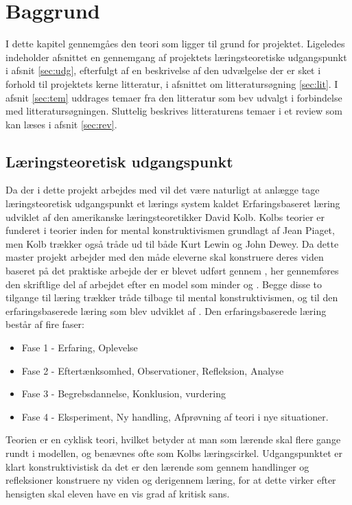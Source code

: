 \chapter{Baggrund}
\label{Ch:2}

I dette kapitel gennemgåes den teori som ligger til grund for projektet. Ligeledes indeholder afsnittet en gennemgang af projektets læringsteoretiske udgangspunkt i afsnit \vref{sec:udg}, efterfulgt af en beskrivelse af den udvælgelse der er sket i forhold til projektets kerne litteratur, i afsnittet om litteratursøgning \vref{sec:lit}. I afsnit \vref{sec:tem} uddrages temaer fra den litteratur som bev udvalgt i forbindelse med litteratursøgningen. Sluttelig beskrives litteraturens temaer i et review som kan læses i afsnit \vref{sec:rev}.


\section{Læringsteoretisk udgangspunkt}
\label{sec:udg}
Da der i dette projekt arbejdes med \ib{} vil det være naturligt at anlægge tage læringsteoretisk udgangspunkt et lærings system kaldet Erfaringsbaseret læring udviklet af den amerikanske læringsteoretikker David Kolb. Kolbs teorier er funderet i teorier inden for mental konstruktivismen grundlagt af Jean Piaget, men Kolb trækker også tråde ud til både Kurt Lewin og John Dewey. Da dette master projekt arbejder med den måde eleverne skal konstruere deres viden baseret på det praktiske arbejde der er blevet udført gennem \ib{}, her gennemføres den skriftlige del af arbejdet efter en model som minder og \sw{}. Begge disse to tilgange til læring trækker tråde tilbage til mental konstruktivismen, og til den erfaringsbaserede læring som blev udviklet af \citep{Kolb1984}.
Den erfaringsbaserede læring består af fire faser:
\begin{itemize}
	\item Fase 1 - Erfaring, Oplevelse\vspace{-10pt}
	\item Fase 2 - Eftertænksomhed, Observationer, Refleksion, Analyse\vspace{-10pt}
	\item Fase 3 - Begrebsdannelse, Konklusion, vurdering\vspace{-10pt}
	\item Fase 4 - Eksperiment, Ny handling, Afprøvning af teori i nye situationer.
\end{itemize}
Teorien er en cyklisk teori, hvilket betyder at man som lærende skal flere gange rundt i modellen, og benævnes ofte som Kolbs læringscirkel. Udgangspunktet er klart konstruktivistisk da det er den lærende som gennem handlinger og refleksioner konstruere ny viden og derigennem læring, for at dette virker efter hensigten skal eleven have en vis grad af kritisk sans. 


